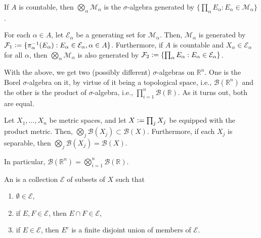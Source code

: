 \documentclass[12pt]{article}	%
\begin{document}
\begin{prop}
	If $A$ is countable, then $\bigotimes_{\alpha} \mathcal{M}_{\alpha}$ is the $\sigma$-algebra generated by $\{\prod_{\alpha} E_{\alpha} : E_{\alpha} \in \mathcal{M}_{\alpha}\}$.
\end{prop}

\begin{prop}
	For each $\alpha \in A$, let $\mathcal{E}_{\alpha}$ be a generating set for $\mathcal{M}_{\alpha}$. Then, $\mathcal{M}_{\alpha}$ is generated by $\mathcal{F}_{1} \vcentcolon= \{\pi_{\alpha}^{-1}(E_{\alpha}) : E_{\alpha} \in \mathcal{E}_{\alpha}, \alpha \in A\}$. \newline
	Furthermore, if $A$ is countable and \underline{$X_{\alpha} \in \mathcal{E}_{\alpha}$} for all $\alpha$, then $\bigotimes_{\alpha} \mathcal{M}_{\alpha}$ is also generated by $\mathcal{F}_{2} \vcentcolon= \{\prod_{\alpha} E_{\alpha} : E_{\alpha} \in \mathcal{E}_{\alpha}\}$.
\end{prop}

With the above, we get two (possibly different) $\sigma$-algebras on $\mathbb{R}^n.$ One is the Borel $\sigma$-algebra on it, by virtue of it being a topological space, i.e., $\mathcal{B}(\mathbb{R}^n)$ and the other is the product of $\sigma$-algebra, i.e., $\prod_{i = 1}^n \mathcal{B}(\mathbb{R}).$ As it turns out, both are equal.

\begin{thm}
	Let $X_{1}, \ldots, X_{n}$ be metric spaces, and let $X \vcentcolon= \prod_{j} X_{j}$ be equipped with the product metric. Then, $\bigotimes_{j} \mathcal{B}(X_{j}) \subset \mathcal{B}(X)$. Furthermore, if each $X_{j}$ is separable, then $\bigotimes_{j} \mathcal{B}(X_{j}) = \mathcal{B}(X)$.

	In particular, $\mathcal{B}(\mathbb{R}^n) = \bigotimes_{i = 1}^{n}\mathcal{B}(\mathbb{R}).$
\end{thm}

\begin{defn}
	An  is a collection $\mathcal{E}$ of subsets of $X$ such that 
	\begin{enumerate}
		\item $\emptyset \in \mathcal{E}$,
		\item if $E, F \in \mathcal{E}$, then $E \cap F \in \mathcal{E}$,
		\item if $E \in \mathcal{E}$, then $E^{c}$ is a finite disjoint union of members of $\mathcal{E}$.
	\end{enumerate}
\end{defn}
\end{document}

